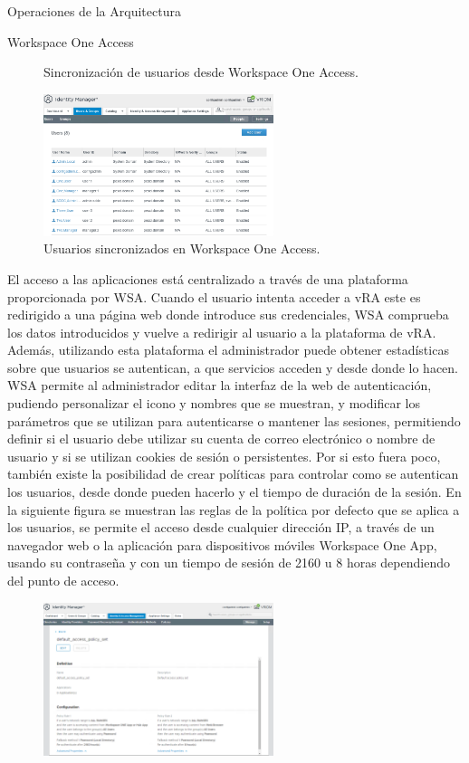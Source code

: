 \begin{subsection}{Operaciones de la Arquitectura}
\begin{subsubsection}{Workspace One Access}
\begin{figure}[h]
            \caption{Sincronización de usuarios desde Workspace One Access.}
            \label{fig:users-defined-WSA}
        \end{figure}
        \FloatBarrier
        \begin{figure}[h]
            \centering
            \includegraphics[width=0.6\textwidth]{imaxes/pruebaconcepto/vrealize/users-wsa.png}
            \caption{Usuarios sincronizados en Workspace One Access.}
            \label{fig:users-defined-WSA}
        \end{figure}
        \FloatBarrier
        El acceso a las aplicaciones está centralizado a través de una plataforma proporcionada por WSA. Cuando el usuario intenta acceder a vRA este es redirigido a una página web donde introduce sus credenciales, WSA comprueba los datos introducidos y vuelve a redirigir al usuario a la plataforma de vRA. Además, utilizando esta plataforma el administrador puede obtener estadísticas sobre que usuarios se autentican, a que servicios acceden y desde donde lo hacen. WSA permite al administrador editar la interfaz de la web de autenticación, pudiendo personalizar el icono y nombres que se muestran, y modificar los parámetros que se utilizan para autenticarse o mantener las sesiones, permitiendo definir si el usuario debe utilizar su cuenta de correo electrónico o nombre de usuario y si se utilizan cookies de sesión o persistentes. Por si esto fuera poco, también existe la posibilidad de crear políticas para controlar como se autentican los usuarios, desde donde pueden hacerlo y el tiempo de duración de la sesión. En la siguiente figura se muestran las reglas de la política por defecto que se aplica a los usuarios, se permite el acceso desde cualquier dirección IP, a través de un navegador web o la aplicación para dispositivos móviles Workspace One App, usando su contraseña y con un tiempo de sesión de 2160 u 8 horas dependiendo del punto de acceso.
        \begin{figure}[h]
            \centering
            \includegraphics[width=0.6\textwidth]{imaxes/pruebaconcepto/vrealize/default-policy.png}

\end{figure}
\end{subsubsection}
\end{subsection}
